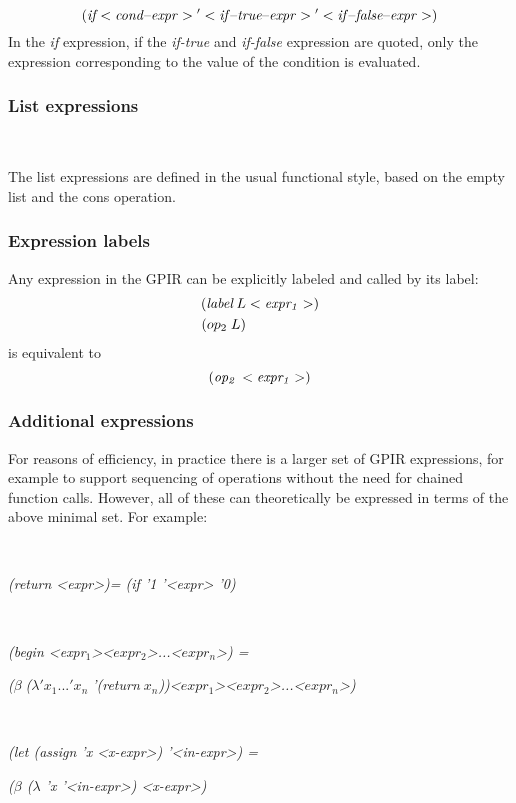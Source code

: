 \documentclass[copyright,creativecommons]{eptcs}
\begin{document}
\emph{
\[
({\it if}\,{\it <cond\text{–}expr>}\;{\it '<if\text{–}true\text{–}expr>}\;'<{\it if\text{–}false\text{–}expr}>)
\]
}In the \emph{if} expression, if the \emph{if-true} and \emph{if-false}
expression are quoted, only the expression corresponding to the value
of the condition is evaluated.


\subsubsection{List expressions}

~

The list expressions are defined in the usual functional style, based
on the empty list and the cons operation.


\subsubsection{Expression labels}

Any expression in the GPIR can be explicitly labeled and called by
its label:\emph{
\begin{align*}
({\it label}\, L & <{\it expr_{1}}>)\\
(op_{2}\; L)
\end{align*}
}is equivalent to\emph{
\[
({\it op_{2}}\,<{\it expr_{1}}>)
\]
}


\subsubsection{Additional expressions}

For reasons of efficiency, in practice there is a larger set of GPIR
expressions, for example to support sequencing of operations without
the need for chained function calls. However, all of these can theoretically
be expressed in terms of the above minimal set. For example:

~

\emph{(return <expr>)= (if '1 '<expr> '0)}

~

\emph{(begin <expr$_{1}$><$expr_{2}$>...<$expr_{n}$>) = }

\emph{($\beta\;$($\lambda'x_{1}...'x_{n}\;$'(return$\; x_{n}$))<$expr_{1}$><$expr_{2}$>...<$expr_{n}$>)}

~

\emph{(let (assign 'x <x-expr>) '<in-expr>) =}

\emph{($\beta$ ($\lambda$ 'x '<in-expr>) <x-expr>)}

~
\end{document}
